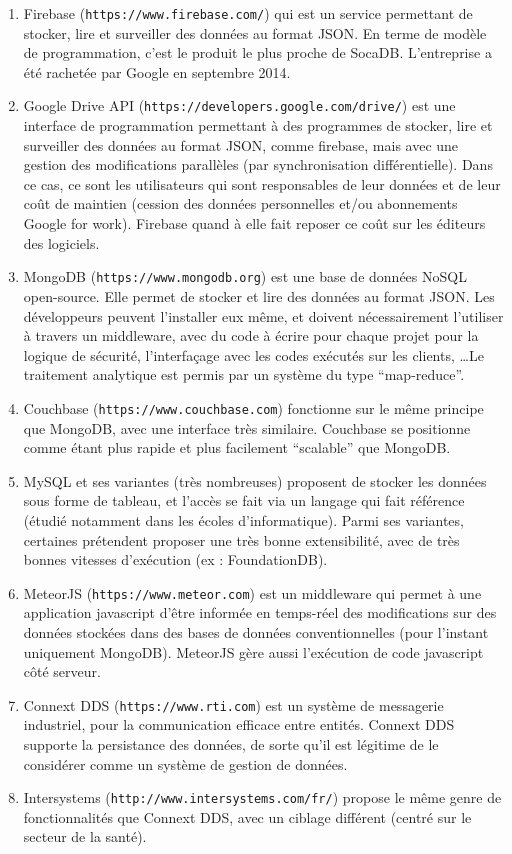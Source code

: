 \documentclass[a4paper,10pt]{scrreprt}
\begin{document}
        \begin{enumerate}
            \item Firebase (\verb&https://www.firebase.com/&) qui est un service permettant de stocker, lire et surveiller des données au format JSON. En terme de modèle de programmation, c'est le produit le plus proche de SocaDB. L'entreprise a été rachetée par Google en septembre 2014.
            \item Google Drive API (\verb&https://developers.google.com/drive/&) est une interface de programmation permettant à des programmes de stocker, lire et surveiller des données au format JSON, comme firebase, mais avec une gestion des modifications parallèles (par synchronisation différentielle). Dans ce cas, ce sont les utilisateurs qui sont responsables de leur données et de leur coût de maintien (cession des données personnelles et/ou abonnements Google for work). Firebase quand à elle fait reposer ce coût sur les éditeurs des logiciels.
            \item MongoDB (\verb&https://www.mongodb.org&) est une base de données NoSQL open-source. Elle permet de stocker et lire des données au format JSON. Les développeurs peuvent l'installer eux même, et doivent nécessairement l'utiliser à travers un middleware, avec du code à écrire pour chaque projet pour la logique de sécurité, l'interfaçage avec les codes exécutés sur les clients, \dots Le traitement analytique est permis par un système du type ``map-reduce''.
            \item Couchbase (\verb&https://www.couchbase.com&) fonctionne sur le même principe que MongoDB, avec une interface très similaire. Couchbase se positionne comme étant plus rapide et plus facilement ``scalable'' que MongoDB.
            \item MySQL et ses variantes (très nombreuses) proposent de stocker les données sous forme de tableau, et l'accès se fait via un langage qui fait référence (étudié notamment dans les écoles d'informatique). Parmi ses variantes, certaines prétendent proposer une très bonne extensibilité, avec de très bonnes vitesses d'exécution (ex : FoundationDB).
            \item MeteorJS (\verb&https://www.meteor.com&) est un middleware qui permet à une application javascript d'être informée en temps-réel des modifications sur des données stockées dans des bases de données conventionnelles (pour l'instant uniquement MongoDB). MeteorJS gère aussi l'exécution de code javascript côté serveur.
            \item Connext DDS (\verb&https://www.rti.com&) est un système de messagerie industriel, pour la communication efficace entre entités. Connext DDS supporte la persistance des données, de sorte qu'il est légitime de le considérer comme un système de gestion de données.
            \item Intersystems (\verb&http://www.intersystems.com/fr/&) propose le même genre de fonctionnalités que Connext DDS, avec un ciblage différent (centré sur le secteur de la santé).
        \end{enumerate}
\end{document}
